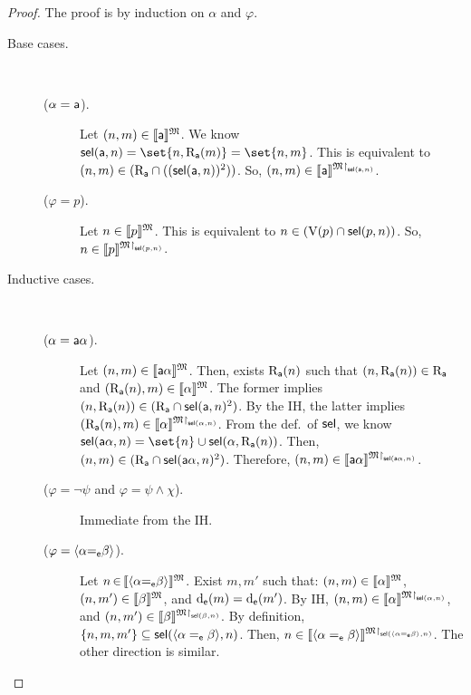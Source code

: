 \begin{proof}
    The proof is by induction on $\alpha$ and $\varphi$.
    \begin{description}  
    \item[Base cases.] \
        \begin{description}
            \item[($\alpha = \mathsf{a}$).]
            Let $(n,m)\in\llbracket{\mathsf{a}}\rrbracket^{\mathfrak{M}}$.
            We know $\sel(\apath,n)=\set{n,\R_\apath(m)} = \set{n,m}$.
            This is equivalent to $(n,m)\in (\mathrm{R}_{\mathsf{a}} \cap ((\operatorname{\mathsf{sel}}(\mathsf{a},n))^2))$.
            So, $(n,m)\in\llbracket{\mathsf{a}}\rrbracket^{\mathfrak{M}{\restriction}_{\operatorname{\mathsf{sel}}(\mathsf{a},n)}}$.
            
            \item[($\varphi = p$).]
            Let $n\in\llbracket{p}\rrbracket^{\mathfrak{M}}$.
            This is equivalent to $n\in(\mathrm{V}(p) \cap \operatorname{\mathsf{sel}}(p,n))$.
            So, $n\in\llbracket{p}\rrbracket^{\mathfrak{M}{\restriction}_{\operatorname{\mathsf{sel}}(p,n)}}$.
        \end{description}
    \item[Inductive cases.] \
        \begin{description}

            \item[($\alpha = \mathsf{a}\alpha$).]
            Let $(n,m)\in\llbracket{\mathsf{a}\alpha}\rrbracket^{\mathfrak{M}}$.
            Then, exists $\mathrm{R}_{\mathsf{a}}(n)$ such that $(n,\mathrm{R}_{\mathsf{a}}(n))\in\mathrm{R}_{\mathsf{a}}$ and ${(\mathrm{R}_{\mathsf{a}}(n),m)\in\llbracket{\alpha}\rrbracket^{\mathfrak{M}}}$.
            The former implies $(n,\mathrm{R}_{\mathsf{a}}(n))\in(\mathrm{R}_{\mathsf{a}} \cap \operatorname{\mathsf{sel}}(\mathsf{a},n)^2)$. By the IH, the latter implies $(\mathrm{R}_{\mathsf{a}}(n),m)\in\llbracket{\alpha}\rrbracket^{\mathfrak{M}{\restriction}_{\operatorname{\mathsf{sel}}(\alpha,n)}}$.
            From the def.~of $\operatorname{\mathsf{sel}}$, we know $\sel(\apath\alpha,n)=\set{n}\cup\sel(\alpha,\R_\apath(n))$.
            Then, $(n,m)\in(\mathrm{R}_{\mathsf{a}} \cap \operatorname{\mathsf{sel}}(\mathsf{a}\alpha,n)^2)$.
            Therefore, $(n,m)\in\llbracket{\mathsf{a}\alpha}\rrbracket^{\mathfrak{M}{\restriction}_{\operatorname{\mathsf{sel}}(\mathsf{a}\alpha,n)}}$.

            \item[($\varphi = \neg\psi$ and $\varphi = \psi\wedge\chi$).]
            Immediate from the IH.
            
            \item[($\varphi = \langle{\alpha{=_{\mathsf{e}}}\beta}\rangle$).]
            Let $n\,{\in}\,\llbracket{\langle{\alpha{=_{\mathsf{e}}}\beta}\rangle}\rrbracket^{\mathfrak{M}}$.
            Exist $m,m'$ such that:
                ${(n,m)\in\llbracket{\alpha}\rrbracket^{\mathfrak{M}}}$,
                ${(n,m')\in\llbracket{\beta}\rrbracket^{\mathfrak{M}}}$, and
                ${\operatorname{d}_{\mathsf{e}}(m)=\operatorname{d}_{\mathsf{e}}(m')}$.
            By IH,
                $(n,m)\in\llbracket{\alpha}\rrbracket^{\mathfrak{M}{\restriction}_{\operatorname{\mathsf{sel}}(\alpha,n)}}$, and
                $(n,m')\in\llbracket{\beta}\rrbracket^{\mathfrak{M}{\restriction}_{\operatorname{\mathsf{sel}}(\beta,n)}}$.
            By definition, $\{n,m,m'\}\subseteq\operatorname{\mathsf{sel}}(\langle{\alpha=_{\mathsf{e}}\beta}\rangle,n)$.
            Then, $n\in\llbracket{\langle{\alpha=_{\mathsf{e}}\beta}\rangle}\rrbracket^{\mathfrak{M}{\restriction}_{\operatorname{\mathsf{sel}}(\langle{\alpha=_{\mathsf{e}}\beta}\rangle,n)}}$.
            The other direction is similar.
                        

\end{description}
\end{description}
\end{proof}
